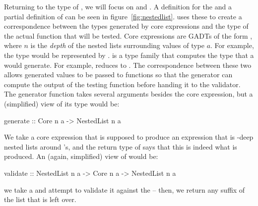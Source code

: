 Returning to the type of ,
we will focus on  and .
A definition for the  and a partial definition of  can be seen in figure~\ref{fig:nestedlist}.
\ourDSL uses these to create a correspondence between the types generated by core expressions
and the type of the actual function that will be tested.
Core expressions are GADTs of the form ,
where $n$ is the \textit{depth} of the nested lists surrounding values of type $a$.
For example, the type \hskin{[[Int]]} would be represented by .
 is a type family
that computes the type that a  would generate.
For example,  reduces to \hskin{[[Int]]}.
The correspondence between these two allows generated values to be passed to functions so that the generator can compute the output of
    the testing function before handing it to the validator.
The generator function takes several arguments besides the core expression,
but a (simplified) view of its type would be:
\begin{smallhskcode}
generate :: Core n a -> NestedList n a
\end{smallhskcode}
We take a core expression that is supposed to produce an expression that is -deep nested lists around 's,
and the return type of  says that this is indeed what is produced.
An (again, simplified) view of  would be:
\begin{smallhskcode}
validate :: NestedList n a -> Core n a -> NestedList n a
\end{smallhskcode}
we take a  and attempt to validate it against the --
then, we return any suffix of the list that is left over.

